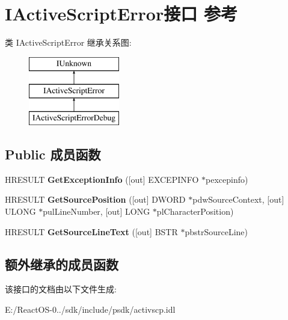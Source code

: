 \hypertarget{interface_i_active_script_error}{}\section{I\+Active\+Script\+Error接口 参考}
\label{interface_i_active_script_error}
类 I\+Active\+Script\+Error 继承关系图\+:\begin{figure}[H]
\begin{center}
\leavevmode
\includegraphics[height=3.000000cm]{interface_i_active_script_error}
\end{center}
\end{figure}
\subsection*{Public 成员函数}
\begin{DoxyCompactItemize}
\item 
\mbox{\label{interface_i_active_script_error_a185f3674369de5401eeade6a2ff1e290}} 
H\+R\+E\+S\+U\+LT {\bfseries Get\+Exception\+Info} (\mbox{[}out\mbox{]} E\+X\+C\+E\+P\+I\+N\+FO $\ast$pexcepinfo)
\item 
\mbox{\label{interface_i_active_script_error_a363a3abec9da4092f019e00bca00f091}} 
H\+R\+E\+S\+U\+LT {\bfseries Get\+Source\+Position} (\mbox{[}out\mbox{]} D\+W\+O\+RD $\ast$pdw\+Source\+Context, \mbox{[}out\mbox{]} U\+L\+O\+NG $\ast$pul\+Line\+Number, \mbox{[}out\mbox{]} L\+O\+NG $\ast$pl\+Character\+Position)
\item 
\mbox{\label{interface_i_active_script_error_aa19726b13ffa0cc83e77bc178d55fd07}} 
H\+R\+E\+S\+U\+LT {\bfseries Get\+Source\+Line\+Text} (\mbox{[}out\mbox{]} B\+S\+TR $\ast$pbstr\+Source\+Line)
\end{DoxyCompactItemize}
\subsection*{额外继承的成员函数}


该接口的文档由以下文件生成\+:\begin{DoxyCompactItemize}
\item 
E\+:/\+React\+O\+S-\/0../sdk/include/psdk/activscp.\+idl\end{DoxyCompactItemize}
